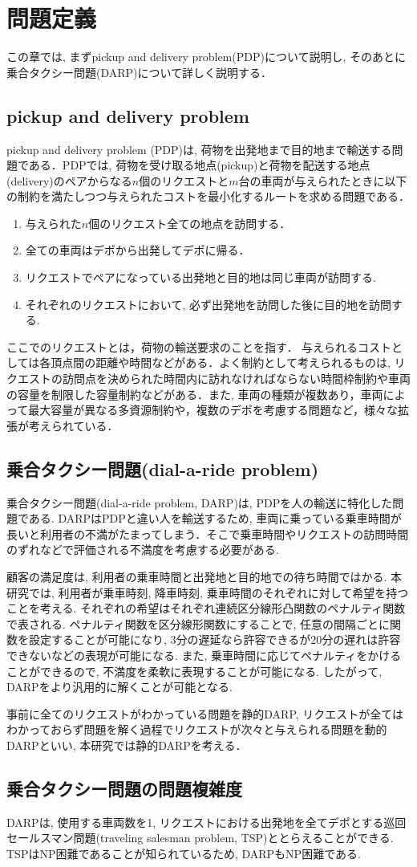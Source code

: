 \chapter{問題定義}\label{definition}
この章では, まずpickup and delivery problem(PDP)について説明し, そのあとに乗合タクシー問題(DARP)について詳しく説明する．
\section{pickup and delivery problem}
pickup and delivery problem (PDP)は, 荷物を出発地まで目的地まで輸送する問題である．PDPでは, 荷物を受け取る地点(pickup)と荷物を配送する地点(delivery)のペアからなる$n$個のリクエストと$m$台の車両が与えられたときに以下の制約を満たしつつ与えられたコストを最小化するルートを求める問題である．
\begin{enumerate}
 \item 与えられた$n$個のリクエスト全ての地点を訪問する．
 \item 全ての車両はデポから出発してデポに帰る．
 \item リクエストでペアになっている出発地と目的地は同じ車両が訪問する.
 \item それぞれのリクエストにおいて, 必ず出発地を訪問した後に目的地を訪問する.
\end{enumerate}
ここでのリクエストとは，荷物の輸送要求のことを指す．
与えられるコストとしては各頂点間の距離や時間などがある．よく制約として考えられるものは, リクエストの訪問点を決められた時間内に訪れなければならない時間枠制約や車両の容量を制限した容量制約などがある．また, 車両の種類が複数あり，車両によって最大容量が異なる多資源制約や，複数のデポを考慮する問題など，様々な拡張が考えられている．

\section{乗合タクシー問題(dial-a-ride problem)}
乗合タクシー問題(dial-a-ride problem, DARP)は, PDPを人の輸送に特化した問題である. DARPはPDPと違い人を輸送するため, 車両に乗っている乗車時間が長いと利用者の不満がたまってしまう．そこで乗車時間やリクエストの訪問時間のずれなどで評価される不満度を考慮する必要がある.

顧客の満足度は, 利用者の乗車時間と出発地と目的地での待ち時間ではかる. 本研究では, 利用者が乗車時刻, 降車時刻, 乗車時間のそれぞれに対して希望を持つことを考える. それぞれの希望はそれぞれ連続区分線形凸関数のペナルティ関数で表される. ペナルティ関数を区分線形関数にすることで, 任意の間隔ごとに関数を設定することが可能になり, 3分の遅延なら許容できるが20分の遅れは許容できないなどの表現が可能になる. また, 乗車時間に応じてペナルティをかけることができるので, 不満度を柔軟に表現することが可能になる. したがって, DARPをより汎用的に解くことが可能となる.

事前に全てのリクエストがわかっている問題を静的DARP, リクエストが全てはわかっておらず問題を解く過程でリクエストが次々と与えられる問題を動的DARPといい, 本研究では静的DARPを考える．

\section{乗合タクシー問題の問題複雑度}
DARPは, 使用する車両数を1, リクエストにおける出発地を全てデポとする巡回セールスマン問題(traveling salesman problem, TSP)ととらえることができる. TSPはNP困難\cite{TSP}であることが知られているため, DARPもNP困難である.
